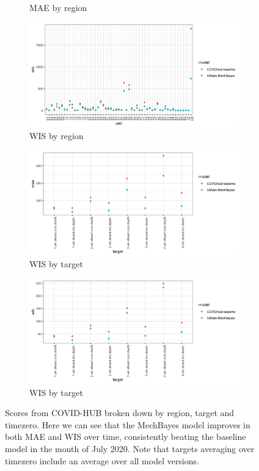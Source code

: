 \documentclass[11pt]{amsart}
\begin{document}
\begin{figure}
\begin{subfigure}{.5\textwidth}
    \caption{MAE by region}
\end{subfigure}%
\begin{subfigure}{.5\textwidth}
  \centering
    \includegraphics[scale=.1]{wis_results_by_region.png}
    \caption{WIS by region}
\end{subfigure}
\begin{subfigure}{.5\textwidth}
  \centering
    \includegraphics[scale=.1]{mae_results_by_target.png}
    \caption{WIS by target}
\end{subfigure}%
\begin{subfigure}{.5\textwidth}
  \centering
    \includegraphics[scale=.1]{wis_results_by_target.png}
    \caption{WIS by target}
\end{subfigure}%

\caption{Scores from COVID-HUB broken down by region, target and timezero. Here we can see that the MechBayes model improves in both MAE and WIS over time, consistently beating the baseline model in the month of July 2020. Note that targets averaging over timezero include an average over all model versions. }
\label{fig:covidhub}
\end{figure}
\end{document}
